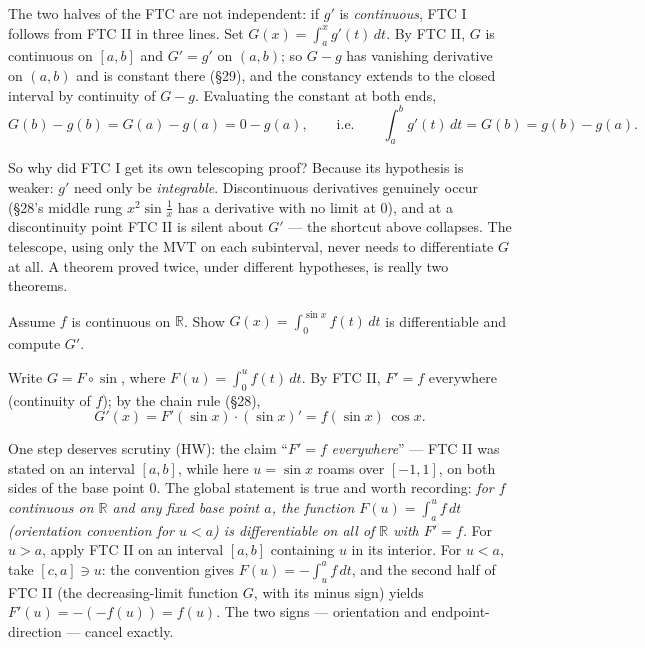 \documentclass[11pt]{report}
\begin{document}
\begin{exbox}
The two halves of the FTC are not independent: if $g'$ is \emph{continuous}, FTC I follows from FTC II in three lines. Set $G(x) = \int_a^x g'(t)\,dt$. By FTC II, $G$ is continuous on $[a,b]$ and $G' = g'$ on $(a,b)$; so $G - g$ has vanishing derivative on $(a,b)$ and is constant there (\S 29), and the constancy extends to the closed interval by continuity of $G - g$. Evaluating the constant at both ends,
\[
G(b) - g(b) = G(a) - g(a) = 0 - g(a), \qquad \text{i.e.} \qquad \int_a^b g'(t)\,dt = G(b) = g(b) - g(a).
\]
\end{exbox}

\begin{rembox}
So why did FTC I get its own telescoping proof? Because its hypothesis is weaker: $g'$ need only be \emph{integrable}. Discontinuous derivatives genuinely occur (\S 28's middle rung $x^2\sin\tfrac1x$ has a derivative with no limit at $0$), and at a discontinuity point FTC II is silent about $G'$ --- the shortcut above collapses. The telescope, using only the MVT on each subinterval, never needs to differentiate $G$ at all. A theorem proved twice, under different hypotheses, is really two theorems.
\end{rembox}

\begin{exbox}
Assume $f$ is continuous on $\mathbb{R}$. Show $G(x) = \displaystyle\int_0^{\sin x} f(t)\,dt$ is differentiable and compute $G'$.

Write $G = F \circ \sin$, where $F(u) = \int_0^u f(t)\,dt$. By FTC II, $F' = f$ everywhere (continuity of $f$); by the chain rule (\S 28),
\[
G'(x) = F'(\sin x)\cdot(\sin x)' = f(\sin x)\,\cos x. \tag*{$\blacksquare$}
\]
\end{exbox}

One step deserves scrutiny (HW): the claim ``$F' = f$ \emph{everywhere}'' --- FTC II was stated on an interval $[a,b]$, while here $u = \sin x$ roams over $[-1,1]$, on both sides of the base point $0$. The global statement is true and worth recording: \emph{for $f$ continuous on $\mathbb{R}$ and any fixed base point $a$, the function $F(u) = \int_a^u f\,dt$ (orientation convention for $u < a$) is differentiable on all of $\mathbb{R}$ with $F' = f$.} For $u > a$, apply FTC II on an interval $[a, b]$ containing $u$ in its interior. For $u < a$, take $[c, a] \ni u$: the convention gives $F(u) = -\int_u^a f\,dt$, and the second half of FTC II (the decreasing-limit function $G$, with its minus sign) yields $F'(u) = -(-f(u)) = f(u)$. The two signs --- orientation and endpoint-direction --- cancel exactly.
\end{document}

